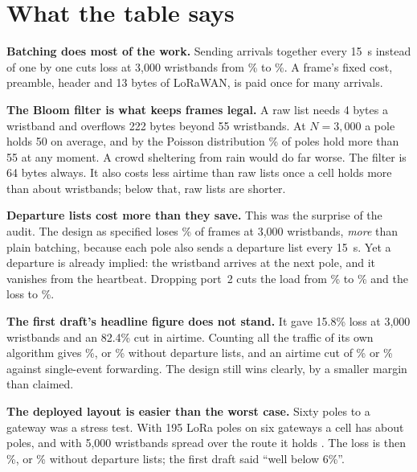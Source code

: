 \documentclass[11pt,a4paper,twoside,openany]{book}
\begin{document}
\section{What the table says}
\begin{table}[htb]\centering\footnotesize\caption{Frame loss, first draft against this model, for 500 / 1,000 / 2,000 /
3,000 wristbands.}\TableCapacityCompare\end{table}
\textbf{Batching does most of the work.} Sending arrivals together every 15~s instead of one by one cuts loss at 3,000
wristbands from \LossSingle\% to \LossBatch\%. A frame's fixed cost, preamble, header and 13 bytes of LoRaWAN, is paid
once for many arrivals.

\textbf{The Bloom filter is what keeps frames legal.} A raw list needs 4 bytes a wristband and overflows 222 bytes
beyond 55 wristbands. At $N=3{,}000$ a pole holds 50 on average, and by the Poisson distribution \OversizeBatch\% of
poles hold more than 55 at any moment. A crowd sheltering from rain would do far worse. The filter is 64 bytes always.
It also costs less airtime than raw lists once a cell holds more than about \BloomPays{} wristbands; below that, raw
lists are shorter.

\textbf{Departure lists cost more than they save.} This was the surprise of the audit. The design as specified loses
\LossRak\% of frames at 3,000 wristbands, \emph{more} than plain batching, because each pole also sends a departure
list every 15~s. Yet a departure is already implied: the wristband arrives at the next pole, and it vanishes from the
heartbeat. Dropping port~2 cuts the load from \LoadRak\% to \LoadRakNd\% and the loss to \LossRakNd\%.

\begin{finding}\textbf{The first draft's headline figure does not stand.} It gave 15.8\% loss at 3,000 wristbands and
an 82.4\% cut in airtime. Counting all the traffic of its own algorithm gives \LossRak\%, or \LossRakNd\% without
departure lists, and an airtime cut of \AirRed\% or \AirRedNd\% against single-event forwarding. The design still wins
clearly, by a smaller margin than claimed.\end{finding}

\textbf{The deployed layout is easier than the worst case.} Sixty poles to a gateway was a stress test. With 195 LoRa
poles on six gateways a cell has about \DepPoles{} poles, and with 5,000 wristbands spread over the route it holds
\DepTags{}. The loss is then \DepLoss\%, or \DepLossNd\% without departure lists; the first draft said ``well below
6\%''.
\end{document}
